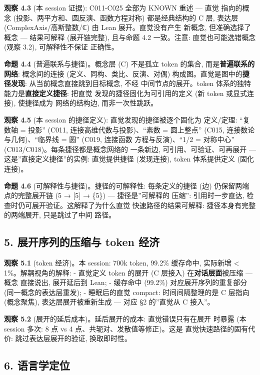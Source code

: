 \documentclass[
]{article}
\begin{document}
\textbf{观察 4.3} (本 session 证据): C011-C025 全部为 KNOWN 重述 ---
直觉 指向的概念 (投影、两平方和、圆反演、函数方程对称) 都是经典结构的 C
层, 表达层 (ComplexAxis/高斯整数/ℂ) 由 Lean 展开。直觉没有产生 新概念,
但准确选择了概念 --- 结果可解释 (展开链完整), 且与命题 4.2 一致。注意:
直觉也可能选错概念 (观察 3.2), 可解释性不保证 正确性。

\textbf{命题 4.4} (普遍联系与捷径)。概念层 (C) 不是孤立 token 的集合,
而是\textbf{普遍联系的网络}: 概念间的连接 (定义、同构、类比、反演、对偶)
构成图。直觉是图中的\textbf{捷径发现}: 从当前概念直接跳到目标概念, 不经
中间节点的展开。token 体系的独特能力是\textbf{直接定义捷径}: 把直觉
发现的捷径固化为可引用的定义 (新 token 或显式连接), 使捷径成为
网络的结构边, 而非一次性跳跃。

\textbf{观察 4.5} (本 session 的捷径定义): 直觉发现的捷径被逐个固化为
定义/定理: ``复数轴 = 投影'' (C011, 连接高维代数与投影)、``素数 =
圆上整点'' (C015, 连接数论与几何)、``临界线 = 圆'' (C019, 连接函数
方程与反演)、``1/2 = 对称中心'' (C013/C018)。每条捷径都是概念网络的
一条新边, 可引用、可验证、可再展开 --- 这是''直接定义捷径''的实例:
直觉提供捷径 (发现连接), token 体系提供定义 (固化连接)。

\textbf{命题 4.6} (可解释性与捷径)。捷径的可解释性: 每条定义的捷径 (边)
仍保留两端点的完整展开链 (5 → {[}5{]} → \{5\}) --- 捷径是''可解释的
压缩'': 引用时一步直达, 检查时仍可展开验证。这解释了为什么直觉
快速路径的结果可解释: 捷径本身有完整的两端展开, 只是跳过了中间 路径。

\subsection{5. 展开序列的压缩与 token
经济}\label{ux5c55ux5f00ux5e8fux5217ux7684ux538bux7f29ux4e0e-token-ux7ecfux6d4e}

\textbf{观察 5.1} (token 经济)。本 session: 700k token, 99.2\% 缓存命中,
实际新增 \textless{} 1\%。解耦视角的解释: - 直觉定义 token 的展开 (C
层接入) 在\textbf{对话层面}被压缩 --- 概念 直接说出, 展开延后到 Lean; -
缓存命中 (99.2\%) 对应展开序列的重复部分 (同一概念的表达层重发); -
睡眠后的直觉 compact: 时间间隔整理的是 C 层指向 (概念聚焦),
表达层展开被重新生成 --- 对应 §2 的''直觉从 C 接入''。

\textbf{观察 5.2} (展开的延后成本)。延后展开的成本: 直觉错误只有在展开
时暴露 (本 session 多次: 8 点 vs 4 点、共轭对、发散值等修正)。这是
直觉快速路径的固有代价: 跳过表达层展开的验证, 换取即时性。

\subsection{6. 语言学定位}\label{ux8bedux8a00ux5b66ux5b9aux4f4d}
\end{document}
